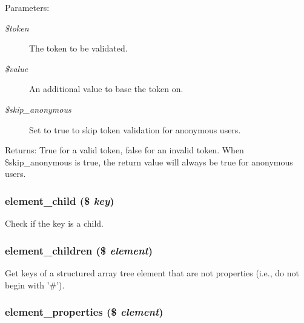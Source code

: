 \begin{Desc}
\item[Parameters:]
\begin{description}
\item[{\em \$token}]The token to be validated. \item[{\em \$value}]An additional value to base the token on. \item[{\em \$skip\_\-anonymous}]Set to true to skip token validation for anonymous users. \end{description}
\end{Desc}
\begin{Desc}
\item[Returns:]True for a valid token, false for an invalid token. When \$skip\_\-anonymous is true, the return value will always be true for anonymous users. \end{Desc}
\hypertarget{common_8inc_3063341f48382cc5ecce25eb1eaa7a0d}{
\subsubsection[{element\_\-child}]{\setlength{\rightskip}{0pt plus 5cm}element\_\-child (\$ {\em key})}}
\label{common_8inc_3063341f48382cc5ecce25eb1eaa7a0d}


Check if the key is a child. \hypertarget{common_8inc_6e3b741f1d5455829b04c356e3dc59a5}{
\subsubsection[{element\_\-children}]{\setlength{\rightskip}{0pt plus 5cm}element\_\-children (\$ {\em element})}}
\label{common_8inc_6e3b741f1d5455829b04c356e3dc59a5}


Get keys of a structured array tree element that are not properties (i.e., do not begin with '\#'). \hypertarget{common_8inc_4ae6d339b27757556fe914f9d78d91e5}{
\subsubsection[{element\_\-properties}]{\setlength{\rightskip}{0pt plus 5cm}element\_\-properties (\$ {\em element})}}
\label{common_8inc_4ae6d339b27757556fe914f9d78d91e5}


